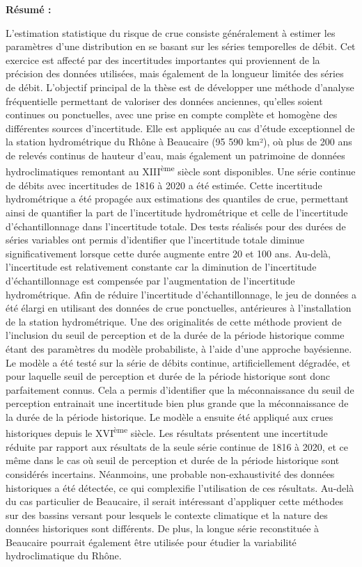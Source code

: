 \thispagestyle{empty}

\noindent \textbf{Résumé :}

\noindent \small{L'estimation statistique du risque de crue consiste généralement à estimer les paramètres d'une distribution en se basant sur les séries temporelles de débit. Cet exercice est affecté par des incertitudes importantes qui proviennent de la précision des données utilisées, mais également de la longueur limitée des séries de débit. L'objectif principal de la thèse est de développer une méthode d'analyse fréquentielle permettant de valoriser des données anciennes, qu'elles soient continues ou ponctuelles, avec une prise en compte complète et homogène des différentes sources d'incertitude. Elle est appliquée au cas d'étude exceptionnel de la station hydrométrique du Rhône à Beaucaire (95 590 km²), où plus de 200 ans de relevés continus de hauteur d'eau, mais également un patrimoine de données hydroclimatiques remontant au XIII\textsuperscript{ème} siècle sont disponibles. Une série continue de débits avec incertitudes de 1816 à 2020 a été estimée. Cette incertitude hydrométrique a été propagée aux estimations des quantiles de crue, permettant ainsi de quantifier la part de l'incertitude hydrométrique et celle de l'incertitude d'échantillonnage dans l'incertitude totale. Des tests réalisés pour des durées de séries variables ont permis d'identifier que l'incertitude totale diminue significativement lorsque cette durée augmente entre 20 et 100 ans. Au-delà, l'incertitude est relativement constante car la diminution de l'incertitude d'échantillonnage est compensée par l'augmentation de l'incertitude hydrométrique. Afin de réduire l'incertitude d'échantillonnage, le jeu de données a été élargi en utilisant des données de crue ponctuelles, antérieures à l'installation de la station hydrométrique. Une des originalités de cette méthode provient de l'inclusion du seuil de perception et de la durée de la période historique comme étant des paramètres du modèle probabiliste, à l'aide d'une approche bayésienne. Le modèle a été testé sur la série de débits continue, artificiellement dégradée, et pour laquelle seuil de perception et durée de la période historique sont donc parfaitement connus. Cela a permis d'identifier que la méconnaissance du seuil de perception entrainait une incertitude bien plus grande que la méconnaissance de la durée de la période historique. Le modèle a ensuite été appliqué aux crues historiques depuis le XVI\textsuperscript{ème} siècle. Les résultats présentent une incertitude réduite par rapport aux résultats de la seule série continue de 1816 à 2020, et ce même dans le cas où seuil de perception et durée de la période historique sont considérés incertains. Néanmoins, une probable non-exhaustivité des données historiques a été détectée, ce qui complexifie l'utilisation de ces résultats. Au-delà du cas particulier de Beaucaire, il serait intéressant d'appliquer cette méthodes sur des bassins versant pour lesquels le contexte climatique et la nature des données historiques sont différents. De plus, la longue série reconstituée à Beaucaire pourrait également être utilisée pour étudier la variabilité hydroclimatique du Rhône.}

